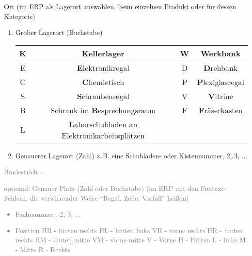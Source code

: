 \documentclass{\basedir/fablab-document}
\begin{document}
\begin{enumerate}
\item Ort (im ERP als Lagerort auswählen, beim einzelnen Produkt oder für dessen Kategorie)
\begin{enumerate}
\item Grober Lagerort (Buchstabe)
	
	\begin{tabular}{c|c|c|c}
	\hline
	K & \textbf{K}ellerlager & W & \textbf{W}erkbank \\
	\hline
	E & \textbf{E}lektronikregal & D & \textbf{D}rehbank \\
	\hline
	C & \textbf{C}hemietisch & P & \textbf{P}lexiglasregal \\
	\hline
	S & \textbf{S}chraubenregal & V & \textbf{V}itrine \\
	\hline
	B & Schrank im \textbf{B}esprechungsraum & F & \textbf{F}räserkasten \\
	\hline
	L & \textbf{L}aborschubladen an Elektronikarbeitsplätzen & & \\
	\hline
	\end{tabular}
\item Genauerer Lagerort (Zahl) \newline
	z.\,B. eine Schubladen- oder Kistennummer, 2, 3, ...
\end{enumerate}
\textcolor{gray}{
\item    Bindestrich --
\item   optional: Genauer Platz (Zahl oder Buchstabe) (im ERP mit den Freitext-Feldern, die verwirrender Weise \enquote{Regal, Zeile, Vorfall} heißen)
	\begin{itemize}
	\item Fachnummer , 2, 3, ...
	\item Position\newline
    HR - hinten rechts\newline
    HL - hinten links\newline
    VR - vorne rechts\newline
    HR - hinten rechts\newline
    HM - hinten mitte\newline
    VM - vorne mitte\newline
    V - Vorne\newline
    H - Hinten\newline
    L - links\newline
    M - Mitte\newline
    R - Rechts
	\end{itemize}
}
\end{enumerate}
\end{document}
